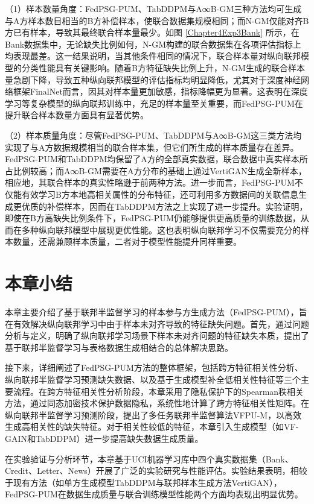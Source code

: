 （1）样本数量角度：FedPSG-PUM、TabDDPM与A∞B-GM三种方法均可生成与A方样本数目相当的B方补偿样本，使联合数据集规模相同；而N-GM仅能对齐B方已有样本，导致其最终联合样本量最少。如图 \ref{Chapter4Exp3Bank} 所示，在Bank数据集中，无论缺失比例如何，N-GM构建的联合数据集在各项评估指标上均表现最差。这一结果说明，当其他条件相同的情况下，联合样本量对纵向联邦模型的分类性能具有关键影响。随着B方特征缺失比例上升，N-GM生成的联合样本量急剧下降，导致五种纵向联邦模型的评估指标均明显降低，尤其对于深度神经网络框架FinalNet而言，因其对样本量更加敏感，指标降幅更为显著。这表明在深度学习等复杂模型的纵向联邦训练中，充足的样本量至关重要，而FedPSG-PUM在提升联合样本数量方面具有显著优势。

（2）样本质量角度：尽管FedPSG-PUM、TabDDPM与A∞B-GM这三类方法均实现了与A方数据规模相当的联合样本集，但它们所生成的样本质量存在差异。FedPSG-PUM和TabDDPM均保留了A方的全部真实数据，联合数据中真实样本所占比例较高；而A∞B-GM需要在A方分布的基础上通过VertiGAN生成全新样本，相应地，其联合样本的真实性略逊于前两种方法。进一步而言，FedPSG-PUM不仅能有效学习B方本地高相关属性的分布特征，还可利用多方数据间的关联信息生成更优质的补偿样本，因而在TabDDPM方法之上实现了进一步提升。实验证明，即使在B方高缺失比例条件下，FedPSG-PUM仍能够提供更高质量的训练数据，从而在多种纵向联邦模型中展现更优性能。这也表明纵向联邦学习不仅需要充分的样本数量，还需兼顾样本质量，二者对于模型性能提升同样重要。
\section{本章小结}
本章主要介绍了基于联邦半监督学习的样本参与方生成方法（FedPSG-PUM），旨在有效解决纵向联邦学习中由于样本未对齐导致的特征缺失问题。首先，通过问题分析与定义，明确了纵向联邦学习场景下样本未对齐问题的特征缺失本质，提出了基于联邦半监督学习与表格数据生成相结合的总体解决思路。

接下来，详细阐述了FedPSG-PUM方法的整体框架，包括跨方特征相关性分析、纵向联邦半监督学习预测缺失数据、以及基于生成模型补全低相关性特征等三个主要流程。在跨方特征相关性分析阶段，本章采用了隐私保护下的Spearman秩相关方法，通过同态加密技术保护数据隐私，系统性地计算了跨方特征相关性矩阵。在纵向联邦半监督学习预测阶段，提出了多任务联邦半监督算法VFPU-M，以高效生成高相关性的缺失特征。对于相关性较低的特征，本章引入生成模型（如VF-GAIN和TabDDPM）进一步提高缺失数据生成质量。

在实验验证与分析环节，本章基于UCI机器学习库中四个真实数据集（Bank、Credit、Letter、News）开展了广泛的实验研究与性能评估。实验结果表明，相较于现有方法（如单方生成模型TabDDPM与联邦样本生成方法VertiGAN），FedPSG-PUM在数据生成质量与联合训练模型性能两个方面均表现出明显优势。


